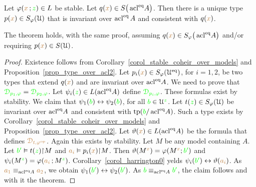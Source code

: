 \begin{theorem}[ (Stationarity)]\label{thm_stationarity}
  Let $\varphi({\color{brown} x}\,;{\color{green} z})\in L$ be stable.
  Let $q({\color{brown} x})\in S\big(\mathop{\rm acl}^{{\rm eq}}\!A\big)$.
  Then there is a unique type $p({\color{brown} x})\in S_\varphi(\EuScript U)$ that is invariant over $\mathop{\rm acl}^{{\rm eq}} A$ and consistent with $q({\color{brown} x})$.
\end{theorem}

The theorem holds, with the same proof, assuming $q({\color{brown} x})\in S_\varphi\big(\mathop{\rm acl}^{{\rm eq}}\!A\big)$ and/or requiring $p({\color{brown} x})\in S(\EuScript U)$.

\begin{proof}
  Existence follows from Corollary~\ref{corol_stable_coheir_over_models} and Proposition~\ref{prop_type_over_acl2}.
  Let $p_i({\color{brown} x})\in S_\varphi(\EuScript U^{{\rm eq}})$, for $i=1,2$, be two types that extend $q({\color{brown} x})$ and are invariant over $\mathop{\rm acl}^{{\rm eq}}\!A$.
  We need to prove that ${\color{green}\EuScript D_{p_1,\varphi}}={\color{green}\EuScript D_{p_2,\varphi}}$.
  Let $\psi_i({\color{green} z})\in L(\mathop{\rm acl}^{{\rm eq}}\!A)$ define ${\color{green}\EuScript D_{p_i,\varphi}}$.
  These formulas exist by stability.
  We claim that $\psi_1({\color{green} b})\leftrightarrow\psi_2({\color{green} b})$, for all ${\color{green} b}\in\EuScript U^{\color{green} z}$.
  Let $t({\color{green} z})\in S_\varphi(\EuScript U)$ be invariant over $\mathop{\rm acl}^{{\rm eq}}\!A$ and consistent with ${\rm tp}({\color{green} b}/\mathop{\rm acl}^{{\rm eq}}\!A)$.
  Such a type exists by Corollary~\ref{corol_stable_coheir_over_models} and Proposition~\ref{prop_type_over_acl2}.
  Let $\vartheta({\color{brown} x})\in L(\mathop{\rm acl}^{{\rm eq}}\!A)$ be the formula that defines ${\color{brown}\EuScript D_{t,\varphi^{\rm op}}}$.
  Again this exists by stability.
  Let $M$ be any model containing $A$.
  Let ${\color{green} b'}\vDash t({\color{green} z}){\restriction}M$ and ${\color{brown} a_i}\vDash p_i({\color{brown} x}){\restriction}M$.
  Then $\vartheta(M^{\color{brown} x})=\varphi(M^{\color{brown} x};{\color{green} b'})$ and $\psi_i(M^{\color{green} z})=\varphi({\color{brown} a_i}\,;M^{\color{green} z})$.
  Corollary~\ref{corol_harrington0} yelds $\psi_i({\color{green} b'})\leftrightarrow\vartheta({\color{brown} a_i})$.
  As ${\color{brown} a_1}\equiv_{\mathop{\rm acl}^{{\rm eq}}\!A}{\color{brown} a_2}$, we obtain $\psi_1({\color{green} b'})\leftrightarrow\psi_2({\color{green} b'})$.
  As ${\color{green} b}\equiv_{\mathop{\rm acl}^{{\rm eq}}\!A}{\color{green} b'}$, the claim follows and with it the theorem.
\end{proof}



